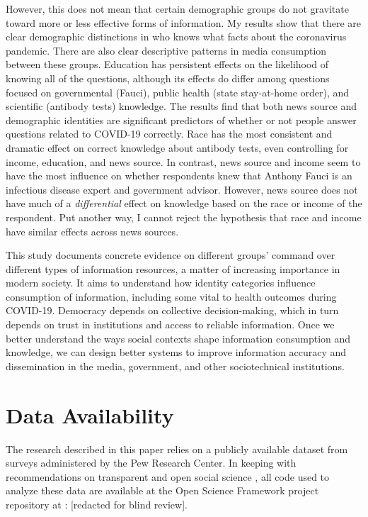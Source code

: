 \documentclass[11pt]{article}
\begin{document}
However, this does not mean that certain demographic groups do not gravitate toward more or less effective forms of information. My results show that there are clear demographic distinctions in who knows what facts about the coronavirus pandemic. There are also clear descriptive patterns in media consumption between these groups. Education has persistent effects on the likelihood of knowing all of the questions, although its effects do differ among questions focused on governmental  (Fauci), public health (state stay-at-home order), and scientific (antibody tests) knowledge. The results find that both news source and demographic identities are significant predictors of whether or not people answer questions related to COVID-19 correctly. Race has the most consistent and dramatic effect on correct knowledge about antibody tests, even controlling for income, education, and news source. In contrast, news source and income seem to have the most influence on whether respondents knew that Anthony Fauci is an infectious disease expert and government advisor. However, news source does not have much of a \emph{differential} effect on knowledge based on the race or income of the respondent. Put another way, I cannot reject the hypothesis that race and income have similar effects across news sources.

This study documents concrete evidence on different groups' command over different types of information resources, a matter of increasing importance in modern society. It aims to understand how identity categories influence consumption of information, including some vital to health outcomes during COVID-19. Democracy depends on collective decision-making, which in turn depends on trust in institutions and access to reliable information. Once we better understand the ways social contexts shape information consumption and knowledge, we can design better systems to improve information accuracy and dissemination in the media, government, and other sociotechnical institutions. 




\section{Data Availability}\label{sec:data-availability}

The research described in this paper relies on a publicly available dataset from surveys administered by the Pew Research Center.
In keeping with recommendations on transparent and open social science \citep{Freese2018}, all code used to analyze these data are available at the Open Science Framework project repository at : [redacted for blind review].
\end{document}
